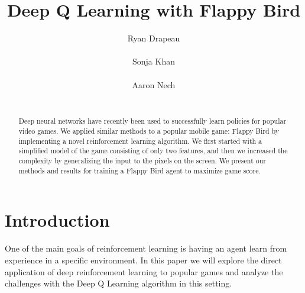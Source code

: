 \documentclass{chi2009}
\begin{document}
\setlength{\paperheight}{11in}
\setlength{\paperwidth}{8.5in}
\setlength{\pdfpageheight}{\paperheight}
\setlength{\pdfpagewidth}{\paperwidth}


\title{Deep Q Learning with Flappy Bird}
\author{
  \alignauthor Ryan Drapeau\\
    \\
  \alignauthor Sonja Khan\\
    \\
  \alignauthor Aaron Nech\\
    \\
}

\maketitle

\begin{abstract}
Deep neural networks have recently been used to successfully learn policies for popular video games. We applied similar methods to a popular mobile game: Flappy Bird by implementing a novel reinforcement learning algorithm. We first started with a simplified model of the game consisting of only two features, and then we increased the complexity by generalizing the input to the pixels on the screen. We present our methods and results for training a Flappy Bird agent to maximize game score.
\end{abstract}


\section{Introduction}

One of the main goals of reinforcement learning is having an agent learn from experience in a specific environment. In this paper we will explore the direct application of deep reinforcement learning to popular games and analyze the challenges with the Deep Q Learning algorithm in this setting.
\end{document}
